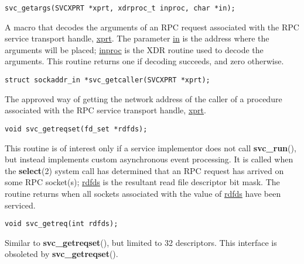 \documentclass[]{article}
\let\realtextbf=\textbf
\renewcommand{\textbf}[1]{\textcolor{boldcolor}{\realtextbf{#1}}}
\renewcommand{\emph}[1]{\underline{#1}}
\begin{document}
\begin{verbatim}
svc_getargs(SVCXPRT *xprt, xdrproc_t inproc, char *in);
\end{verbatim}

\begin{description}
\itemsep1pt\parskip0pt
\item[]
A macro that decodes the arguments of an RPC request associated with the
RPC service transport handle, \emph{xprt}. The parameter \emph{in} is
the address where the arguments will be placed; \emph{inproc} is the XDR
routine used to decode the arguments. This routine returns one if
decoding succeeds, and zero otherwise.
\end{description}

\begin{verbatim}
struct sockaddr_in *svc_getcaller(SVCXPRT *xprt);
\end{verbatim}

\begin{description}
\itemsep1pt\parskip0pt
\item[]
The approved way of getting the network address of the caller of a
procedure associated with the RPC service transport handle, \emph{xprt}.
\end{description}

\begin{verbatim}
void svc_getreqset(fd_set *rdfds);
\end{verbatim}

\begin{description}
\itemsep1pt\parskip0pt
\item[]
This routine is of interest only if a service implementor does not call
\textbf{svc\_run}(), but instead implements custom asynchronous event
processing. It is called when the \textbf{select}(2) system call has
determined that an RPC request has arrived on some RPC socket(s);
\emph{rdfds} is the resultant read file descriptor bit mask. The routine
returns when all sockets associated with the value of \emph{rdfds} have
been serviced.
\end{description}

\begin{verbatim}
void svc_getreq(int rdfds);
\end{verbatim}

\begin{description}
\itemsep1pt\parskip0pt
\item[]
Similar to \textbf{svc\_getreqset}(), but limited to 32 descriptors.
This interface is obsoleted by \textbf{svc\_getreqset}().
\end{description}
\end{document}
